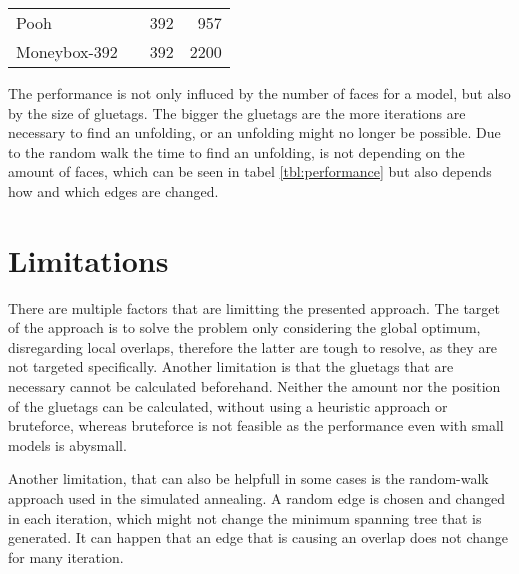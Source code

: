 \documentclass[draft,final]{vutinfth} %
\begin{document}
\begin{tabular}{|ll|r|r|}
Pooh & & 392 & 957 \\
Moneybox-392 & & 392 & 2200 \\
\hline
\end{tabular}
\label{tbl:performance}
\endgroup

The performance is not only influced by the number of faces for a model, but also by the size of gluetags. The bigger the gluetags are the more iterations are necessary to find an unfolding, or an unfolding might no longer be possible. Due to the random walk the time to find an unfolding, is not depending on the amount of faces, which can be seen in tabel \ref{tbl:performance} but also depends how and which edges are changed.

\section{Limitations}
\label{sec:limitations}

There are multiple factors that are limitting the presented approach. The target of the approach is to solve the problem only considering the global optimum, disregarding local overlaps, therefore the latter are tough to resolve, as they are not targeted specifically.
Another limitation is that the gluetags that are necessary cannot be calculated beforehand. Neither the amount nor the position of the gluetags can be calculated, without using a heuristic approach or bruteforce, whereas bruteforce is not feasible as the performance even with small models is abysmall.

Another limitation, that can also be helpfull in some cases is the random-walk approach used in the simulated annealing. A random edge is chosen and changed in each iteration, which might not change the minimum spanning tree that is generated. It can happen that an edge that is causing an overlap does not change for many iteration.
\end{document}
